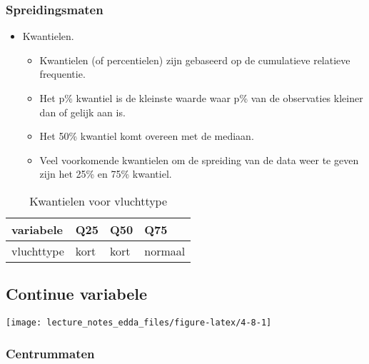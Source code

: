 \documentclass[]{memoir}
\providecommand{\tightlist}{%
  \setlength{\itemsep}{0pt}\setlength{\parskip}{0pt}}
\begin{document}
\subsubsection*{Spreidingsmaten}\label{spreidingsmaten}

\begin{itemize}
\tightlist
\item
  Kwantielen.

  \begin{itemize}
  \tightlist
  \item
    Kwantielen (of percentielen) zijn gebaseerd op de cumulatieve
    relatieve frequentie.
  \item
    Het p\% kwantiel is de kleinste waarde waar p\% van de observaties
    kleiner dan of gelijk aan is.
  \item
    Het 50\% kwantiel komt overeen met de mediaan.
  \item
    Veel voorkomende kwantielen om de spreiding van de data weer te
    geven zijn het 25\% en 75\% kwantiel.
  \end{itemize}
\end{itemize}

\begin{table}[t]

\caption{\label{tab:4-7}Kwantielen voor vluchttype}
\centering
\fontsize{10}{12}\selectfont
\begin{tabular}{llll}
\toprule
variabele & Q25 & Q50 & Q75\\
\midrule
vluchttype & kort & kort & normaal\\
\bottomrule
\end{tabular}
\end{table}

\subsection{Continue variabele}\label{continue-variabele-1}

\texttt{[image: lecture\_notes\_edda\_files/figure-latex/4-8-1]}

\subsubsection*{Centrummaten}\label{centrummaten-1}
\end{document}
